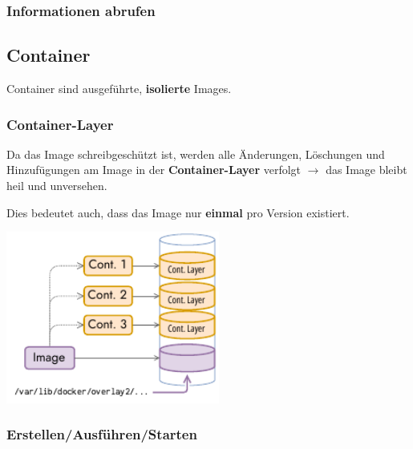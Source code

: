 \documentclass[
  10pt,
  a4paper,
]{article}
\newenvironment{Shaded}{}{}
\newcommand{\ExtensionTok}[1]{\textcolor[rgb]{0.84,0.23,0.29}{\textbf{#1}}}
\newcommand{\NormalTok}[1]{\textcolor[rgb]{0.14,0.16,0.18}{#1}}
\newcommand{\OperatorTok}[1]{\textcolor[rgb]{0.14,0.16,0.18}{#1}}
\begin{document}
\begin{multicols*}{2}
{}

\subsubsection{\texorpdfstring{{\small \faTerminal\hspace{1mm}}
Informationen
abrufen}{ Informationen abrufen}}\label{informationen-abrufen}

\begin{Shaded}
\end{Shaded}

\subsection{Container}\label{container}

Container sind ausgeführte, \textbf{isolierte} Images.

\subsubsection{Container-Layer}\label{container-layer}

Da das Image schreibgeschützt ist, werden alle Änderungen, Löschungen
und Hinzufügungen am Image in der \textbf{Container-Layer} verfolgt
\(\rightarrow\) das Image bleibt heil und unversehen.

Dies bedeutet auch, dass das Image nur \textbf{einmal} pro Version
existiert.

\begin{center}
\includegraphics[width=7cm,height=\textheight]{images/docker/volume_clayer.pdf}
\end{center}

\subsubsection{\texorpdfstring{{\small \faTerminal\hspace{1mm}}
Erstellen/Ausführen/Starten}{ Erstellen/Ausführen/Starten}}\label{erstellenausfuxfchrenstarten}


\end{multicols*}
\end{document}

